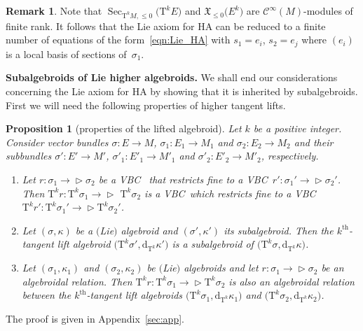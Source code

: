 \documentclass[pdftex]{sigma}
\newcommand{\ZM}{{VBC}} %
\newcommand{\thh}[1]{#1^{\mathrm{th}}} %
\newcommand{\Sec}{\operatorname{Sec}}
\newcommand{\dd}{\mathrm{d}}
\newcommand{\X}{\mathfrak{X}}
\newcommand{\ra}{\rightarrow}
\newcommand{\TT}[1]{\mathrm{T}^{#1}} %
\newcommand{\Cf}{\mathcal{C}^\infty}
\def\relto{\rightarrow\!\!\vartriangleright} %
\numberwithin{equation}{section}
\newtheorem{prop}[thm]{Proposition}
\theoremstyle{definition}
\newtheorem{rem}[thm]{Remark}
\begin{document}
\begin{rem} Note that $\Sec_{\TT{k} M, \leq0}\big(\TT{k} E\big)$ and $\X_{\leq0}\big(E^k\big)$ are $\Cf(M)$-modules of finite rank. It follows that the Lie axiom for HA can be reduced to a finite number of equations of the form~\eqref{eqn:Lie_HA} with $s_1=e_i$, $s_2=e_j$ where $(e_i)$ is a local basis of sections of~$\sigma_1$.
\end{rem}

{\bf Subalgebroids of Lie higher algebroids.} We shall end our considerations concerning the Lie axiom for HA by showing that it is inherited by subalgebroids. First we will need the following properties of higher tangent lifts.
\begin{prop}[properties of the lifted algebroid] \label{prop:sub_algebroidal_rel} Let $k$ be a positive integer. Consider vector bundles $\sigma\colon E\ra M$, $\sigma_1\colon E_1\ra M_1$ and $\sigma_2\colon E_2\ra M_2$ and their subbundles $\sigma'\colon E'\ra M'$, $\sigma'_1\colon E'_1\ra M'_1$ and $\sigma'_2\colon E'_2\ra M'_2$, respectively.
\begin{enumerate}[$(i)$]\itemsep=0pt
 \item \label{item:T^kr restricts_fine} Let
 $r\colon \sigma_1\relto \sigma_2$ be a \ZM
	\ that restricts fine to a \ZM\ $r'\colon \sigma_1'\relto \sigma_2'$. Then $\TT{k} r\colon \TT{k}\sigma_1\mbox{$\relto$}$ $\TT{k}\sigma_2$ is a \ZM\ which restricts fine to a \ZM\ $\TT{k} r'\colon \TT{k} \sigma_1'\relto\TT{k} \sigma_2'$.
 \item \label{item:T^kE_as_subalgeroid} Let $(\sigma,\kappa)$ be a $($Lie$)$ algebroid and $(\sigma',\kappa')$ its subalgebroid. Then the $\thh{k}$-tangent lift algebroid $\big(\TT{k}\sigma',\dd_{\TT{k}}\kappa'\big)$ is a subalgebroid of $\big(\TT{k}\sigma,\dd_{\TT{k}}\kappa\big)$.
 \item \label{item:T^kr_also_algebroidal} Let $(\sigma_1, \kappa_1)$ and $(\sigma_2,\kappa_2)$ be $($Lie$)$ algebroids and let $r\colon \sigma_1\relto \sigma_2$ be an algebroidal relation. Then $\TT{k} r\colon \TT{k} \sigma_1\relto \TT{k} \sigma_2$ is also an algebroidal relation between the $\thh{k}$-tangent lift algebroids $\big(\TT{k}\sigma_1,\dd_{\TT{k}}\kappa_1\big)$ and $\big(\TT{k}\sigma_2,\dd_{\TT{k}}\kappa_2\big)$.
\end{enumerate}
\end{prop}
The proof is given in Appendix~\ref{sec:app}.
\end{document}
